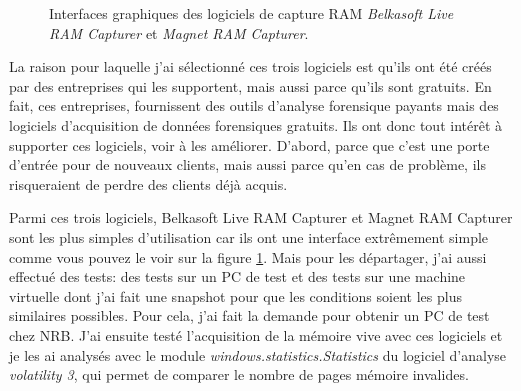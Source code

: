 \begin{figure}
    \centering
    \caption{Interfaces graphiques des logiciels de capture RAM \textit{Belkasoft Live RAM Capturer} et \textit{Magnet RAM Capturer}.}
    \label{fig:ram-capture-softwares}
\end{figure}

La raison pour laquelle j'ai sélectionné ces trois logiciels est qu'ils ont été créés par des entreprises qui les supportent, mais aussi parce qu'ils sont gratuits. En fait, ces entreprises, fournissent des outils d'analyse forensique payants mais des logiciels d'acquisition de données forensiques gratuits. Ils ont donc tout intérêt à supporter ces logiciels, voir à les améliorer. D'abord, parce que c'est une porte d'entrée pour de nouveaux clients, mais aussi parce qu'en cas de problème, ils risqueraient de perdre des clients déjà acquis.

Parmi ces trois logiciels, Belkasoft Live RAM Capturer et Magnet RAM Capturer sont les plus simples d'utilisation car ils ont une interface extrêmement simple comme vous pouvez le voir sur la figure \ref{fig:ram-capture-softwares}. Mais pour les départager, j'ai aussi effectué des tests: des tests sur un PC de test et des tests sur une machine virtuelle dont j'ai fait une snapshot pour que les conditions soient les plus similaires possibles. Pour cela, j'ai fait la demande pour obtenir un PC de test chez NRB. J'ai ensuite testé l'acquisition de la mémoire vive avec ces logiciels et je les ai analysés avec le module \textit{windows.statistics.Statistics} du logiciel d'analyse \textit{volatility 3}, qui permet de comparer le nombre de pages mémoire invalides.

